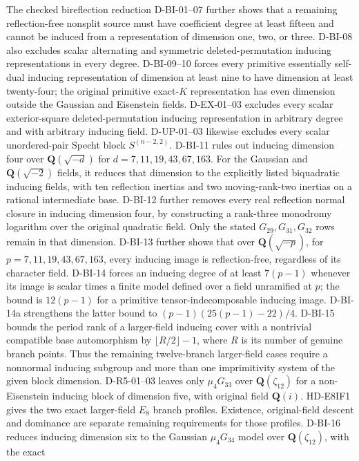 \documentclass[11pt]{article}
\theoremstyle{remark}\newtheorem{remark}[theorem]{Remark}
\newcommand{\Q}{\mathbf Q}\newcommand{\Z}{\mathbf Z}
\begin{document}
The checked bireflection reduction D-BI-01--07 further shows that a
remaining reflection-free nonsplit source must have coefficient degree
at least fifteen and cannot be induced from a representation of dimension
one, two, or three. D-BI-08 also excludes scalar alternating and
symmetric deleted-permutation inducing representations in every degree.
D-BI-09--10 forces every primitive essentially self-dual inducing
representation of dimension at least nine to have dimension at least
twenty-four; the original primitive exact-$K$ representation has even
dimension outside the Gaussian and Eisenstein fields. D-EX-01--03
excludes every scalar exterior-square deleted-permutation inducing
representation in arbitrary degree and with arbitrary inducing field.
D-UP-01--03 likewise excludes every scalar unordered-pair Specht block
$S^{(n-2,2)}$. D-BI-11 rules out inducing dimension four over
$\Q(\sqrt{-d})$ for $d=7,11,19,43,67,163$. For the Gaussian and
$\Q(\sqrt{-2})$ fields, it reduces that dimension to the explicitly
listed biquadratic inducing fields, with ten reflection inertias and
two moving-rank-two inertias on a rational intermediate base.
D-BI-12 further removes every real reflection normal closure in
inducing dimension four, by constructing a rank-three monodromy
logarithm over the original quadratic field. Only the stated
$G_{29},G_{31},G_{32}$ rows remain in that dimension.
D-BI-13 further shows that over $\Q(\sqrt{-p})$, for
$p=7,11,19,43,67,163$, every inducing image is reflection-free,
regardless of its character field. D-BI-14 forces an inducing
degree of at least $7(p-1)$ whenever its image is scalar times a
finite model defined over a field unramified at $p$; the bound is
$12(p-1)$ for a primitive tensor-indecomposable inducing image.
D-BI-14a strengthens the latter bound to
$(p-1)(25(p-1)-22)/4$. D-BI-15 bounds the period rank of a
larger-field inducing cover with a nontrivial compatible base
automorphism by $\lfloor R/2\rfloor-1$, where $R$ is its number
of genuine branch points. Thus the remaining twelve-branch
larger-field cases require a nonnormal inducing subgroup and
more than one imprimitivity system of the given block dimension.
D-R5-01--03 leaves only $\mu_4G_{33}$ over $\Q(\zeta_{12})$
for a non-Eisenstein inducing block of dimension five, with
original field $\Q(i)$. HD-E8IF1 gives the two exact larger-field
$E_8$ branch profiles. Existence, original-field descent and
dominance are separate remaining requirements for those profiles.
D-BI-16 reduces inducing dimension six to the Gaussian
$\mu_4G_{34}$ model over $\Q(\zeta_{12})$, with the exact
\end{document}
